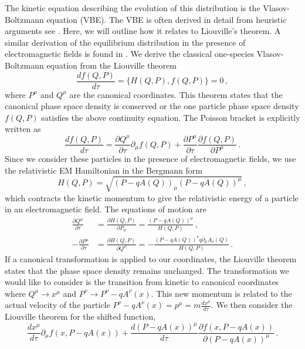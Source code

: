 The kinetic equation describing the evolution of this distribution is the Vlasov-Boltzmann equation (VBE). The VBE is often derived in detail from heuristic arguments see \cite{DeGroot:1980dk,Cercignani2002}. Here, we will outline how it relates to Liouville's theorem. A similar derivation of the equilibrium distribution in the presence of electromagnetic fields is found in \cite{Hakim2011}.
We derive the classical one-species Vlasov-Boltzmann equation from the Liouville theorem
\begin{equation}
    \frac{d f(Q,P)}{d\tau} = \{H(Q,P), f(Q,P)\} = 0\,,
\end{equation}
where $P^{\mu}$ and $Q^{\mu}$ are the canonical coordinates. 
This theorem states that the canonical phase space density is conserved or the one particle phase space density $f(Q,P)$ satisfies the above continuity equation.  The Poisson bracket is explicitly written as 
\begin{equation}
    \frac{d f(Q,P)}{d\tau} = \frac{\partial Q^{\mu}}{\partial \tau}\partial_\mu f(Q,P) + \frac{\partial P^{\mu}}{\partial \tau}\frac{\partial f(Q,P)}{\partial P^{\mu}}\,.
\end{equation}
Since we consider these particles in the presence of electromagnetic fields, we use the relativistic EM Hamiltonian in the Bergmann form
\begin{equation}
    H(Q,P) = \sqrt{(P-q A(Q))_\mu(P-q A(Q))^\mu}\,,
\end{equation}
which contracts the kinetic momentum to give the relativistic energy of a particle in an electromagnetic field. The equations of motion are
\begin{align}
    \frac{\partial Q^{\mu}}{\partial \tau} &= \frac{\partial H(Q,P)}{\partial P_{\mu}}= \frac{(P-q A(Q))^{\mu}}{H(Q,P)}\,,\\
   -\frac{\partial P^{\mu}}{\partial \tau} &= \frac{\partial H(Q,P)}{\partial Q^{\mu}}= - \frac{(P-q A(Q))^{\nu}q \partial_\mu A_\nu(Q)}{H(Q,P)}\,.
\end{align}
If a canonical transformation is applied to our coordinates, the Liouville theorem states that the phase space density remains unchanged. 
The transformation we would like to consider is the transition from kinetic to canonical coordinates where $Q^{\mu}\rightarrow x^{\mu}$ and  $P^{\nu} \rightarrow P^{\nu} - q A^{\nu}(x)$. This new momentum is related to the actual velocity of the particle $P^{\nu} - q A^{\nu}(x) = p^{\mu} = m\frac{d x^{\mu}}{d \tau}$.  We then consider the Liouville theorem for the shifted function,  
\begin{equation}
 \frac{d x^{\mu}}{d \tau}\partial_\mu f(x,P-q A(x)) + \frac{d (P-q A(x))^{\mu}}{d \tau}\frac{\partial f(x,P-q A(x))}{\partial (P-q A(x))^{\mu}}\,.
\end{equation}
